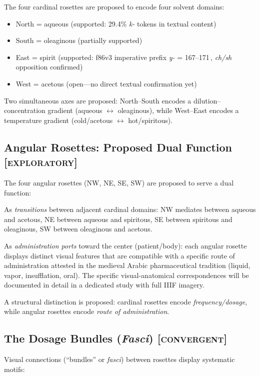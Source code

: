 \documentclass[11pt,a4paper]{article}
\newcommand{\convergent}{\textsc{[convergent]}}
\newcommand{\exploratory}{\textsc{[exploratory]}}
\begin{document}
The four cardinal rosettes are proposed to encode four solvent domains:

\begin{itemize}[leftmargin=2em]
\item North = aqueous (supported: 29.4\% \textit{k-} tokens in textual content)
\item South = oleaginous (partially supported)
\item East = spirit (supported: f86v3 imperative prefix \textit{y-} = 167--171\,\textperthousand{}, \textit{ch/sh} opposition confirmed)
\item West = acetous (open---no direct textual confirmation yet)
\end{itemize}

Two simultaneous axes are proposed: North--South encodes a dilution--concentration gradient (aqueous $\leftrightarrow$ oleaginous), while West--East encodes a temperature gradient (cold/acetous $\leftrightarrow$ hot/spiritous).

\subsection{Angular Rosettes: Proposed Dual Function \exploratory{}}

The four angular rosettes (NW, NE, SE, SW) are proposed to serve a dual function:

As \textit{transitions} between adjacent cardinal domains: NW mediates between aqueous and acetous, NE between aqueous and spiritous, SE between spiritous and oleaginous, SW between oleaginous and acetous.

As \textit{administration ports} toward the center (patient/body): each angular rosette displays distinct visual features that are compatible with a specific route of administration attested in the medieval Arabic pharmaceutical tradition (liquid, vapor, insufflation, oral). The specific visual-anatomical correspondences will be documented in detail in a dedicated study with full IIIF imagery.

A structural distinction is proposed: cardinal rosettes encode \textit{frequency/dosage}, while angular rosettes encode \textit{route of administration}.

\subsection{The Dosage Bundles (\textit{Fasci}) \convergent{}}

Visual connections (``bundles'' or \textit{fasci}) between rosettes display systematic motifs:
\end{document}
